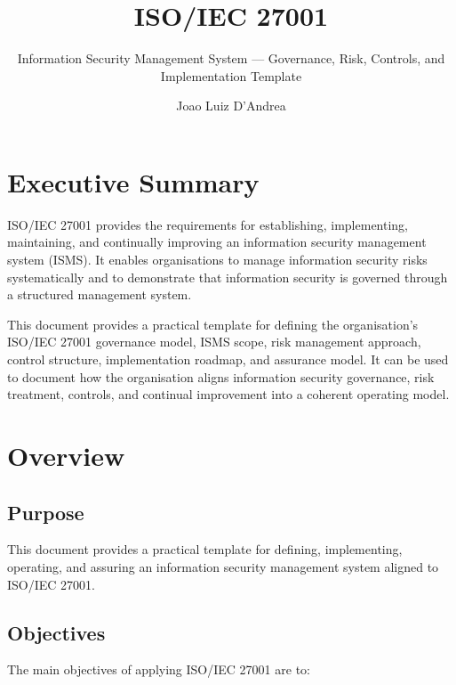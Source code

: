\documentclass[
  letterpaper,
  DIV=11,
  numbers=noendperiod]{scrartcl}
\title{ISO/IEC 27001}
\subtitle{Information Security Management System --- Governance, Risk,
Controls, and Implementation Template}
\author{Joao Luiz D'Andrea}
\date{}
\renewcommand*\contentsname{Table of contents}
\newcommand\contentsname{Table of contents}
\begin{document}
\maketitle

\renewcommand*\contentsname{Table of contents}
{
\hypersetup{linkcolor=}
\setcounter{tocdepth}{3}
\tableofcontents
}

\section{Executive Summary}\label{executive-summary}

ISO/IEC 27001 provides the requirements for establishing, implementing,
maintaining, and continually improving an information security
management system (ISMS). It enables organisations to manage information
security risks systematically and to demonstrate that information
security is governed through a structured management system.

This document provides a practical template for defining the
organisation's ISO/IEC 27001 governance model, ISMS scope, risk
management approach, control structure, implementation roadmap, and
assurance model. It can be used to document how the organisation aligns
information security governance, risk treatment, controls, and continual
improvement into a coherent operating model.

\section{Overview}\label{overview}

\subsection{Purpose}\label{purpose}

This document provides a practical template for defining, implementing,
operating, and assuring an information security management system
aligned to ISO/IEC 27001.

\subsection{Objectives}\label{objectives}

The main objectives of applying ISO/IEC 27001 are to:
\end{document}
